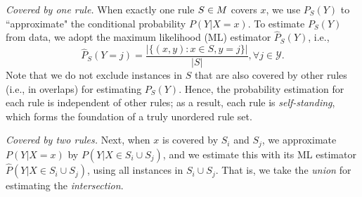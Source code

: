 \smallskip \noindent
\emph{Covered by one rule.} 
When exactly one rule $S \in M$ covers $x$, we use $P_S(Y)$ to ``approximate" the conditional probability $P(Y|X=x)$. To estimate $P_S(Y)$ from data, we adopt the maximum likelihood (ML) estimator $\hat{P}_S(Y)$, i.e.,
\begin{equation}
\hat{P}_S(Y = j) = \frac{|\{(x,y): x \in S, y = j\}|}{|S|}, \forall j \in \mathscr{Y}. 
\end{equation}
Note that we do not exclude instances in $S$ that are also covered by other rules (i.e., in overlaps) for estimating $P_S(Y)$. Hence, the probability estimation for each rule is independent of other rules; as a result, each rule is \emph{self-standing}, which forms the foundation of a truly unordered rule set. 

\smallskip \noindent
\emph{Covered by two rules.}
Next, when $x$ is covered by $S_i$ and $S_j$, we approximate $P(Y|X=x)$ by $P(Y|X \in S_i \cup S_j)$, and we estimate this with its ML estimator $\hat{P}(Y|X \in S_i \cup S_j)$, using all instances in $S_i \cup S_j$. That is, we take the \emph{union} for estimating the \emph{intersection}. 

